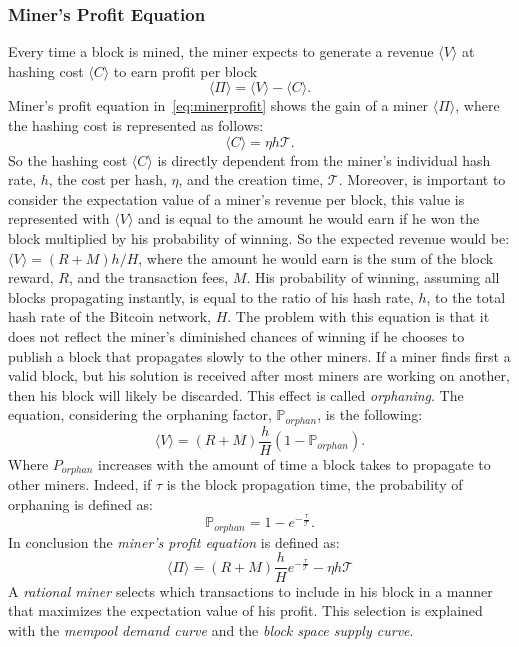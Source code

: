 \documentclass[USenglish]{uit-thesis}
\begin{document}
\subsubsection{Miner's Profit Equation}
Every time a block is mined, the miner expects to generate a revenue $\langle V \rangle$
at hashing cost $\langle C \rangle$ to earn profit per block
\begin{equation}
\label{eq:minerprofit}
\langle \Pi \rangle = \langle V\rangle - \langle C\rangle.
\end{equation}
Miner's profit equation in~\ref{eq:minerprofit} shows the gain of a miner $\langle \Pi \rangle$,
where the hashing cost is represented as follows:
\begin{equation}
\label{eq:hashingcost}
\langle C\rangle = \eta h\mathcal{T}.
\end{equation}
So the hashing cost $\langle C\rangle$ is directly dependent from the miner's individual hash rate, $h$,
the cost per hash, $\eta$, and the creation time, $\mathcal{T}$. Moreover, is important to consider the
expectation value of a miner's revenue per block, this value is represented with $\langle V\rangle$
and is equal to the amount he would earn if he won the block multiplied by his probability of
winning. So the expected revenue would be:
$\langle V\rangle = (R + M) h/H$,
where the amount he would earn is the sum of
the block reward, $R$, and the transaction fees, $M$.
His probability of winning, assuming all blocks propagating
instantly, is equal to the ratio of his hash
rate, $h$, to the total hash rate of the Bitcoin network,
$H$. The problem with this equation is that it
does not reflect the miner's diminished chances of
winning if he chooses to publish a block that propagates
slowly to the other miners. If a miner finds first a valid block,
but his solution is received after most miners
are working on another, then his block will likely be discarded.
This effect is called \emph{orphaning}. The
equation, considering the orphaning factor, $\mathbb{P}_{orphan}$, is the following:
\begin{equation}
\label{eq:expectedrevenue}
\langle V\rangle = \left(R + M\right)\frac{h}{H}\left(1 - \mathbb{P}_{orphan}\right).
\end{equation}
Where $P_{orphan}$ increases with the amount of time a block takes
to propagate to other miners. Indeed, if $\tau$ is
the block propagation time, the
probability of orphaning is defined as:
\begin{equation}
\label{eq:orphaning}
\mathbb{P}_{orphan} = 1 - e^{-\frac{\tau}{\mathcal{T}}}.
\end{equation}
In conclusion the \emph{miner's profit equation} is defined as:
\begin{equation}
\label{eq:minerprofiteq}
\langle \Pi \rangle = (R + M)\frac{h}{H} e^{-\frac{\tau}{\mathcal{T}}} -\eta h\mathcal{T}
\end{equation}
A \emph{rational miner} selects which transactions to include in his block in a manner that maximizes
the expectation value of his profit. This selection is explained with the \emph{mempool demand curve}
and the \emph{block space supply curve}.
\end{document}
